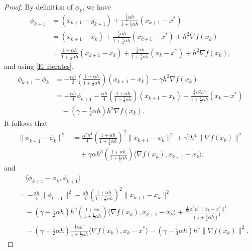 \documentclass[pdflatex,sn-mathphys-num]{sn-jnl}
\theoremstyle{thmstyleone}
\theoremstyle{thmstyletwo}
\theoremstyle{thmstylethree}
\begin{document}
\begin{appendices}
\begin{proof}
By definition of $\phi_k$, we have
\begin{align*}
\phi_{k+1} 
&= (x_{k+1}-y_{k+1}) + \frac{ \frac{1}{2}\alpha h }{ 1 + \frac{1}{2}\alpha h }(x_{k+1}-x^*) \\
&= (x_{k+1}-x_k) + \frac{ \frac{1}{2}\alpha h }{ 1 + \frac{1}{2}\alpha h }(x_{k+1}-x^*) + h^2 \nabla f(x_k)\\
&= \frac{ 1 + \alpha h }{ 1 + \frac{1}{2}\alpha h }(x_{k+1}-x_k)
  + \frac{ \frac{1}{2}\alpha h }{ 1 + \frac{1}{2}\alpha h }(x_k-x^*) + h^2 \nabla f(x_k), 
\end{align*}
and using \eqref{E: iterates},
\begin{align*}
\phi_{k+1}-\phi_k
&= -\frac{\alpha h}{2}\left( \frac{ 1 + \alpha h }{ 1 + \frac{1}{2}\alpha h } \right) (x_{k+1}-x_k) - \gamma h^2 \nabla f(x_k) \\
&= -\frac{\alpha h}{4}\phi_{k+1}
   - \frac{\alpha h}{4}\left( \frac{ 1 + \alpha h }{ 1 + \frac{1}{2}\alpha h } \right)(x_{k+1}-x_k)
   + \frac{\frac{1}{8}\alpha^2 h^2}{1+\frac{1}{2}\alpha h}(x_k-x^*) \\
&\quad -\left( \gamma - \frac{1}{4}\alpha h \right) h^2 \nabla f(x_k).
\end{align*}
It follows that
\begin{align*}
\| \phi_{k+1}-\phi_k \|^2
&= \frac{\alpha^2 h^2}{4}\left( \frac{ 1 + \alpha h }{ 1 + \frac{1}{2}\alpha h } \right)^2\| x_{k+1}-x_k \|^2 
  + \gamma^2 h^4 \| \nabla f(x_k) \|^2 \\
&\quad + \gamma\alpha h^3 \left( \frac{ 1 + \alpha h }{ 1 + \frac{1}{2}\alpha h } \right) \langle \nabla f(x_k), x_{k+1} - x_k \rangle,
\end{align*}
and
\begin{align*}
&\quad \langle \phi_{k+1}-\phi_k, \phi_{k+1} \rangle \\
&= - \frac{\alpha h}{4}\| \phi_{k+1} \|^2
   - \frac{\alpha h}{4} \left(\frac{ 1 + \alpha h }{ 1 + \frac{1}{2}\alpha h }\right)^2\| x_{k+1}-x_k \|^2 \\
&\quad - \left( \gamma - \frac{1}{2}\alpha h \right) h^2 \left(\frac{ 1 + \alpha h }{ 1 + \frac{1}{2}\alpha h }\right) \langle \nabla f(x_k),x_{k+1}-x_k \rangle
   + \frac{\frac{1}{16}\alpha^3 h^3 \| x_k - x^* \|^2 }{\left( 1+\frac{1}{2}\alpha h \right)^2} \\
&\quad - \left( \gamma - \frac{1}{2}\alpha h \right)\frac{ \frac{1}{2}\alpha h^3 }{1+\frac{1}{2}\alpha h}\langle \nabla f(x_k), x_k-x^* \rangle
   -\left( \gamma - \frac{1}{4}\alpha h \right) h^4 \| \nabla f(x_k) \|^2.

\end{align*}
\end{proof}
\end{appendices}
\end{document}
